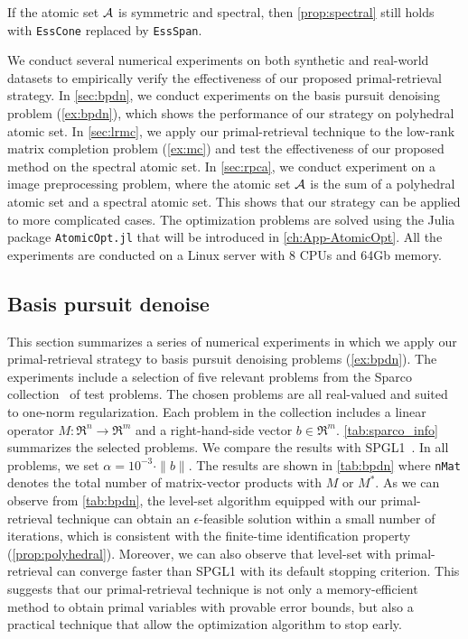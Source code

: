 \begin{corollary}
    If the atomic set $\mathcal{A}$ is symmetric and spectral, then \autoref{prop:spectral} still holds with \texttt{EssCone} replaced by \texttt{EssSpan}. 
\end{corollary}

We conduct several numerical experiments on both synthetic and real-world datasets to empirically verify the effectiveness of our proposed primal-retrieval strategy. In \autoref{sec:bpdn}, we conduct experiments on the basis pursuit denoising problem (\autoref{ex:bpdn}), which shows the performance of our strategy on polyhedral atomic set. In \autoref{sec:lrmc}, we apply our primal-retrieval technique to the low-rank matrix completion problem (\autoref{ex:mc}) and test the effectiveness of our proposed method on the spectral atomic set. In \autoref{sec:rpca}, we conduct experiment on 
a image preprocessing problem, where the atomic set $\mathcal{A}$ is the sum of a polyhedral atomic set and a spectral atomic set. This shows that our strategy can be applied to more complicated cases. The optimization problems are solved using the Julia package \texttt{AtomicOpt.jl} that will be introduced in \autoref{ch:App-AtomicOpt}. All the experiments are conducted on a Linux server with 8 CPUs and 64Gb memory.

\subsection{Basis pursuit denoise} \label{sec:bpdn}

This section summarizes a series of numerical experiments in which we apply our primal-retrieval strategy to basis pursuit denoising problems (\autoref{ex:bpdn}). The experiments include a selection of five relevant problems from the Sparco collection~\cite{BergFrieHennHerrSaabYilm:2008} of test problems. The chosen problems are all real-valued and suited to one-norm regularization. Each problem in the collection includes a linear operator $M:\Re^n \to \Re^m$ and a right-hand-side vector $b \in \Re^m$. \autoref{tab:sparco_info} summarizes the selected problems. We compare the results with SPGL1~\cite{BergFriedlander:2008}. In all problems, we set $\alpha = 10^{-3}\cdot\|b\|$. The results are shown in \autoref{tab:bpdn} where \texttt{nMat} denotes the total number of matrix-vector products with $M$ or $M^*$. 
As we can observe from \autoref{tab:bpdn}, the level-set algorithm equipped with our primal-retrieval technique can obtain an $\epsilon$-feasible solution within a small number of iterations, which is consistent with the finite-time identification property (\autoref{prop:polyhedral}). Moreover, we can also observe that level-set with primal-retrieval can converge faster than SPGL1 with its default stopping criterion. This suggests that our primal-retrieval technique is not only a memory-efficient method to obtain primal variables with provable error bounds, but also a practical technique that allow the optimization algorithm to stop early.


